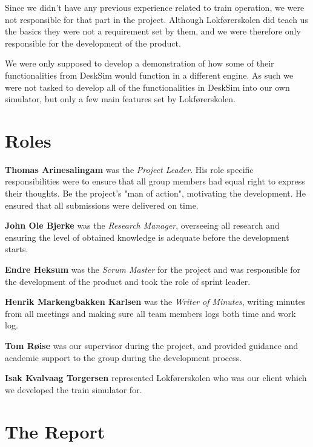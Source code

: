 Since we didn't have any previous experience related to train operation, we were not responsible for that part in the project. Although Lokførerskolen did teach us the basics they were not a requirement set by them, and we were therefore only responsible for the development of the product.

We were only supposed to develop a demonstration of how some of their functionalities from DeskSim would function in a different engine. As such we were not tasked to develop all of the functionalities in DeskSim into our own simulator, but only a few main features set by Lokførerskolen.




\section{Roles}
\textbf{Thomas Arinesalingam} was the \textit{Project Leader}. His role specific responsibilities were to ensure that all group members had equal right to express their thoughts. Be the project's "man of action", motivating the development. He ensured that all submissions were delivered on time. 

\textbf{John Ole Bjerke} was the \textit{Research Manager}, overseeing all research and ensuring the level of obtained knowledge is adequate before the development starts.

\textbf{Endre Heksum} was the \textit{Scrum Master} for the project and was responsible for the development of the product and took the role of sprint leader.

\textbf{Henrik Markengbakken Karlsen} was the \textit{Writer of Minutes}, writing minutes from all meetings and making sure all team members logs both time and work log.

\textbf{Tom Røise} was our supervisor during the project, and provided guidance and academic support to the group during the development process.

\textbf{Isak Kvalvaag Torgersen} represented Lokførerskolen who was our client which we developed the train simulator for. 


\section{The Report}
